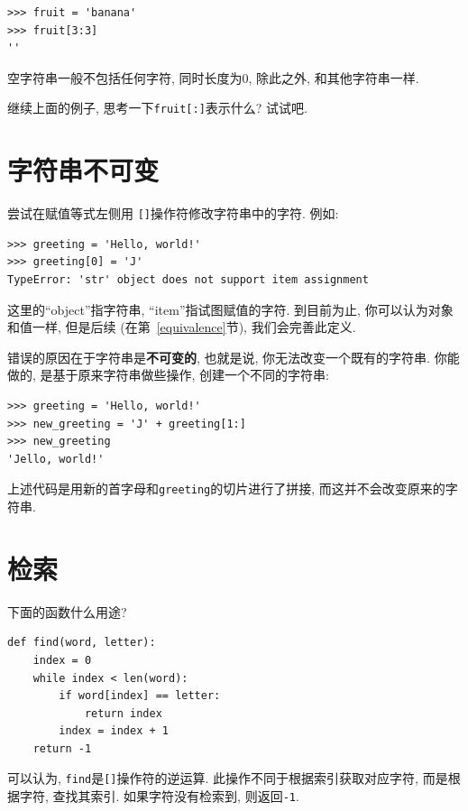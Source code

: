 \documentclass[10pt]{book}
\begin{document}
\begin{verbatim}
>>> fruit = 'banana'
>>> fruit[3:3]
''
\end{verbatim}
%
空字符串一般不包括任何字符, 同时长度为0, 除此之外, 
和其他字符串一样. 

继续上面的例子, 思考一下{\tt fruit[:]}表示什么? 试试吧. 



\section{字符串不可变}

尝试在赋值等式左侧用 {\tt []}操作符修改字符串中的字符. 
例如:

\begin{verbatim}
>>> greeting = 'Hello, world!'
>>> greeting[0] = 'J'
TypeError: 'str' object does not support item assignment
\end{verbatim}
%
这里的``object''指字符串, ``item''指试图赋值的字符. 
到目前为止, 你可以认为对象和值一样, 但是后续
(在第~\ref{equivalence}节), 我们会完善此定义. 

错误的原因在于字符串是{\bf 不可变的}, 
也就是说, 你无法改变一个既有的字符串. 
你能做的, 是基于原来字符串做些操作, 创建一个不同的字符串:

\begin{verbatim}
>>> greeting = 'Hello, world!'
>>> new_greeting = 'J' + greeting[1:]
>>> new_greeting
'Jello, world!'
\end{verbatim}
%
上述代码是用新的首字母和{\tt greeting}的切片进行了拼接, 
而这并不会改变原来的字符串. 


\section{检索}
\label{find}
下面的函数什么用途?

\begin{verbatim}
def find(word, letter):
    index = 0
    while index < len(word):
        if word[index] == letter:
            return index
        index = index + 1
    return -1
\end{verbatim}
%
可以认为, {\tt find}是{\tt []}操作符的逆运算. 
此操作不同于根据索引获取对应字符, 
而是根据字符, 查找其索引. 如果字符没有检索到, 
则返回{\tt -1}. 
\end{document}
